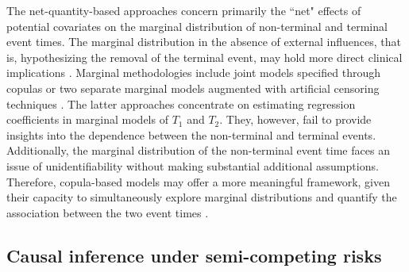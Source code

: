 \documentclass[useAMS,usenatbib,referee]{biom}
\theoremstyle{plain}
\begin{document}
The net-quantity-based approaches concern primarily the ``net" effects of potential covariates on the marginal distribution of non-terminal and terminal event times. The marginal distribution in the absence of external influences, that is, hypothesizing the removal of the terminal event, may hold more direct clinical implications \citep{varadhan2014}. Marginal methodologies include joint models specified through copulas \citep{peng2007semicompeting,chen2012semicompeting,peng2018semicompeting} or two separate marginal models augmented with artificial censoring techniques \citep{peng2006artificial,Ding2009artificial}. 
The latter approaches concentrate on estimating regression coefficients in marginal models of $T_1$ and $T_2$.
They, however, fail to provide insights into the dependence between the non-terminal and terminal events. 
Additionally, the marginal distribution of the non-terminal event time faces an issue of unidentifiability without making substantial additional assumptions.  
Therefore, copula-based models may offer a more meaningful framework, given their capacity to simultaneously explore marginal distributions and quantify the association between the two event times \citep{emura2021conditional,sun2023penalised,wei2023bivariate,yu2023unified}.

\subsection{Causal inference under semi-competing risks}
\end{document}

